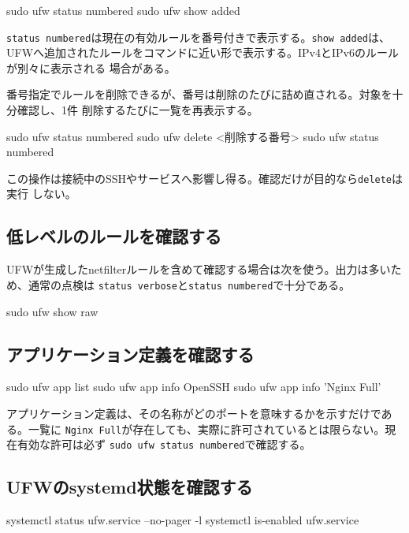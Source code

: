 \documentclass[uplatex,a4paper,11pt]{jsarticle}
\begin{document}
\begin{command}
sudo ufw status numbered
sudo ufw show added
\end{command}

\texttt{status numbered}は現在の有効ルールを番号付きで表示する。\texttt{show added}は、
UFWへ追加されたルールをコマンドに近い形で表示する。IPv4とIPv6のルールが別々に表示される
場合がある。

番号指定でルールを削除できるが、番号は削除のたびに詰め直される。対象を十分確認し、1件
削除するたびに一覧を再表示する。

\begin{command}
sudo ufw status numbered
sudo ufw delete <削除する番号>
sudo ufw status numbered
\end{command}

この操作は接続中のSSHやサービスへ影響し得る。確認だけが目的なら\texttt{delete}は実行
しない。

\subsection{低レベルのルールを確認する}

UFWが生成したnetfilterルールを含めて確認する場合は次を使う。出力は多いため、通常の点検は
\texttt{status verbose}と\texttt{status numbered}で十分である。

\begin{command}
sudo ufw show raw
\end{command}

\subsection{アプリケーション定義を確認する}

\begin{command}
sudo ufw app list
sudo ufw app info OpenSSH
sudo ufw app info 'Nginx Full'
\end{command}

アプリケーション定義は、その名称がどのポートを意味するかを示すだけである。一覧に
\texttt{Nginx Full}が存在しても、実際に許可されているとは限らない。現在有効な許可は必ず
\texttt{sudo ufw status numbered}で確認する。

\subsection{UFWのsystemd状態を確認する}

\begin{command}
systemctl status ufw.service --no-pager -l
systemctl is-enabled ufw.service
\end{command}
\end{document}
